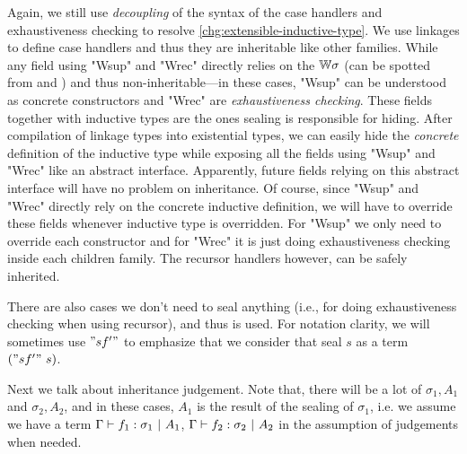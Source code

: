 Again, we still use \textit{decoupling} of the syntax of the case
handlers and exhaustiveness checking to resolve
\ref{chg:extensible-inductive-type}. We use linkages to define
case handlers and thus they are inheritable like other families.
While any field using "Wsup" and "Wrec" directly relies on the
${\mathbb{W}}\sigma$ (can be spotted from  and
) and thus non-inheritable---in these cases, "Wsup"
can be understood as concrete constructors and "Wrec" are
\textit{exhaustiveness checking}. These fields together with inductive
types are the ones sealing is responsible for hiding. After compilation
of linkage types into existential types, we can easily hide the
\textit{concrete} definition of the inductive type while exposing all
the fields using "Wsup" and "Wrec" like an abstract interface.
Apparently, future fields relying on this abstract interface will have no
problem on inheritance.
Of course, since "Wsup" and "Wrec" directly rely on the concrete inductive definition, we will have to override these fields whenever inductive type is overridden. For "Wsup" we only need to override each constructor and for "Wrec" it is just doing exhaustiveness checking inside each children family. The recursor handlers however, can be safely inherited.

There are also cases we don't need to seal anything (i.e., for doing
exhaustiveness checking when using recursor), and thus  is
used. For notation clarity, we will sometimes use $"sf'"$ to emphasize
that we consider that seal $s$ as a term $("sf'" \ s)$.





Next we talk about inheritance judgement. Note that, there will be a lot of $\sigma_1, A_1$ and $\sigma_2, A_2$, and in these cases, $A_1$ is the result of the sealing of $\sigma_1$, i.e. we assume we have a term ${ {\Gamma} \vdash {f_1} : {\sigma_1} \ |\ {A_1} }$, ${ {\Gamma} \vdash {f_2} : {\sigma_2} \ |\ {A_2} }$ in the assumption of judgements when needed.


